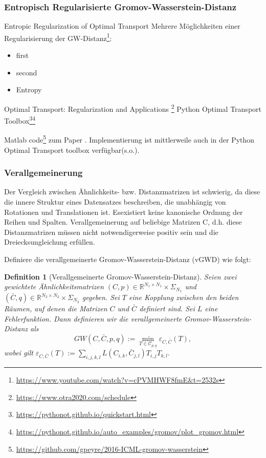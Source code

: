 \documentclass[twoside, 12pt,a4paper]{article}
\newtheorem{definition}[theorem]{Definition}
\numberwithin{equation}{section}
\begin{document}
	\subsubsection{Entropisch Regularisierte Gromov-Wasserstein-Distanz}
	Entropic Regularization of Optimal Transport \cite{computationalOT}
	Mehrere Möglichkeiten einer Regularisierung der GW-Distanz\footnote{\url{https://www.youtube.com/watch?v=cPVMHWF8fmE&t=2532s}}:
	\begin{itemize}
		\item first\\
		\item second \\
		\item Entropy
	\end{itemize} 
	
	Optimal Transport: Regularization and Applications
	\footnote{\url{https://www.otra2020.com/schedule}}
	Python Optimal Transport Toolbox\footnote{\url{https://pythonot.github.io/quickstart.html}}\footnote{\url{https://pythonot.github.io/auto_examples/gromov/plot_gromov.html}}
	
	Matlab code\footnote{\url{https://github.com/gpeyre/2016-ICML-gromov-wasserstein}} zum Paper \cite{gwd_averaging_kernels}.
	Implementierung ist mittlerweile auch in der Python Optimal Transport toolbox verfügbar(s.o.).
	
	
	\subsubsection{Verallgemeinerung}
	Der Vergleich zwischen Ähnlichkeits- bzw. Distanzmatrizen ist schwierig, da diese die innere Struktur eines Datensatzes beschreiben, die unabhängig von Rotationen und Translationen ist. Esexistiert keine kanonische Ordnung der Reihen und Spalten.
	Verallgemeinerung auf beliebige  Matrizen C, d.h. diese Distanzmatrizen müssen nicht notwendigerweise positiv sein und die Dreiecksungleichung erfüllen.
	
	Definiere die verallgemeinerte Gromov-Wasserstein-Distanz (vGWD) wie folgt:
	
	\begin{definition}[Verallgemeinerte Gromov-Wasserstein-Distanz]
		Seien zwei gewichtete Ähnlichkeitsmatrizen $(C,p) \in \mathbb{R}^{N_1 \times N_1} \times \Sigma_{N_1}$ und $(\bar{C},q) \in \mathbb{R}^{N_2 \times N_2} \times \Sigma_{N_2}$ gegeben. Sei $T$ eine Kopplung zwischen den beiden Räumen, auf denen die Matrizen $C$ und $\bar{C}$ definiert sind. Sei $L$ eine Fehlerfunktion. Dann definieren wir die verallgemeinerte Gromov-Wasserstein-Distanz als
		\begin{equation} \label{GWD_definition}
			GW(C, \bar{C}, p, q) := \min_{T \in \mathcal{C}_{p, q}}{\mathcal{\varepsilon}_{C,\bar{C}}(T)},
		\end{equation}
		wobei gilt $\mathcal{\varepsilon}_{C,\bar{C}}(T) := \sum_{i,j,k,l}{L(C_{i,k}, \bar{C}_{j,l})T_{i,j}T_{k,l}}.$
		
	\end{definition}
\end{document}

